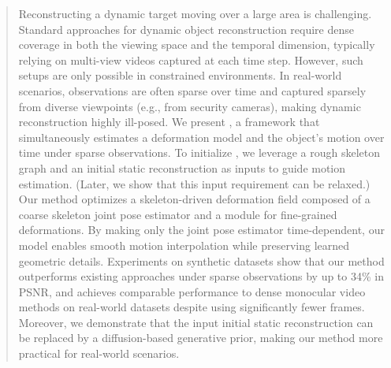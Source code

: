 \begin{abstract}
Reconstructing a dynamic target moving over a large area is challenging. Standard approaches for dynamic object reconstruction require dense coverage in both the viewing space and the temporal dimension, typically relying on multi-view videos captured at each time step.
However, such setups are only possible in constrained environments.
In real-world scenarios, observations are often sparse over time and captured sparsely from diverse viewpoints (e.g., from security cameras), making dynamic reconstruction highly ill-posed. 
We present \ourmethod, a framework that simultaneously estimates a deformation model and the object’s motion over time under sparse observations.
To initialize \ourmethod, we
leverage a rough skeleton graph and an initial static reconstruction as inputs to guide motion estimation. (Later, we show that this input requirement can be relaxed.)
Our method optimizes a skeleton-driven deformation field composed of a coarse skeleton joint pose estimator and a module for fine-grained deformations.
By making only the joint pose estimator time-dependent, our model enables smooth motion interpolation while preserving learned geometric details. 
Experiments on synthetic datasets show that our method outperforms existing approaches under sparse observations by up to 34\% in PSNR, and achieves comparable performance to dense monocular video methods on real-world datasets despite using significantly fewer frames. Moreover, we demonstrate that the input initial static reconstruction can be replaced by a diffusion-based generative prior, making our method more practical for real-world scenarios. 


\end{abstract}